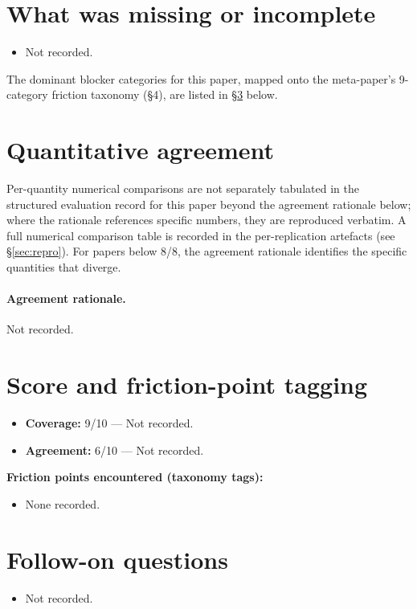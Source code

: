 \documentclass[11pt]{article}
\begin{document}
\section{What was missing or incomplete}
\begin{itemize}
\item Not recorded.
\end{itemize}
The dominant blocker categories for this paper, mapped onto the meta-paper's 9-category friction taxonomy (\S4), are listed in \S\ref{sec:friction} below.

\section{Quantitative agreement}
Per-quantity numerical comparisons are not separately tabulated in the structured evaluation record for this paper beyond the agreement rationale below; where the rationale references specific numbers, they are reproduced verbatim. A full numerical comparison table is recorded in the per-replication artefacts (see \S\ref{sec:repro}). For papers below 8/8, the agreement rationale identifies the specific quantities that diverge.

\paragraph{Agreement rationale.} Not recorded.

\section{Score and friction-point tagging}\label{sec:friction}
\begin{itemize}
\item \textbf{Coverage:} 9/10 --- Not recorded.
\item \textbf{Agreement:} 6/10 --- Not recorded.
\end{itemize}

\noindent\textbf{Friction points encountered (taxonomy tags):}
\begin{itemize}
\item None recorded.
\end{itemize}

\section{Follow-on questions}
\begin{itemize}
\item Not recorded.
\end{itemize}
\end{document}

